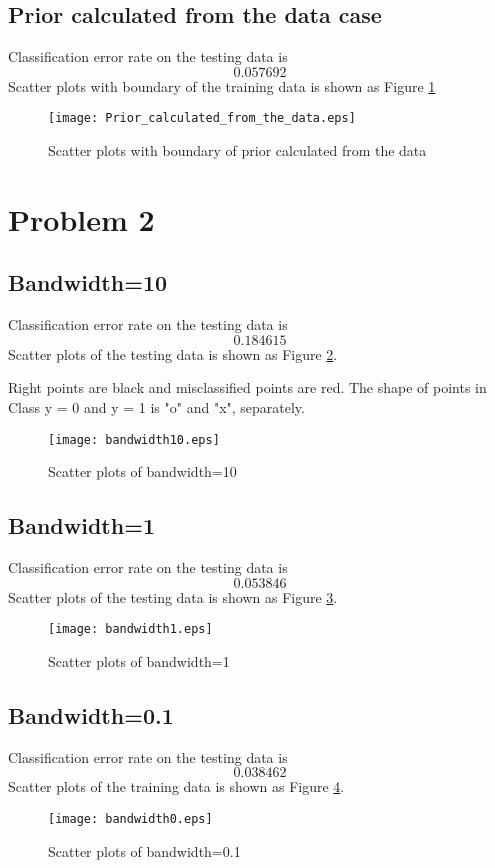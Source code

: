 \documentclass{article}
\begin{document}
\subsection{Prior calculated from the data case}
Classification error rate on the testing data is
			 \begin{equation}
				0.057692
				\end{equation}
Scatter plots with boundary  of the training data is shown as Figure \ref{fig:data_prior}
\begin{figure}[!hbp]
    		\texttt{[image: Prior\_calculated\_from\_the\_data.eps]}
		\centering
		\caption{Scatter plots with boundary  of prior calculated from the data}
		\label{fig:data_prior}
    		\end{figure}
\newpage
\section{Problem 2}
	\subsection{Bandwidth=10}
Classification error rate on the testing data is
			 \begin{equation}
				0.184615 
				\end{equation}
Scatter plots of the testing data is shown as Figure \ref{fig:d=10}.

Right points are black and misclassified points are red. The shape of points in Class y = 0 and y = 1 is "o" and "x", separately.
\begin{figure}[!hbp]
    		\texttt{[image: bandwidth10.eps]}
		\centering
		\caption{Scatter plots of bandwidth=10}
		\label{fig:d=10}
    		\end{figure}
	\subsection{Bandwidth=1}
Classification error rate on the testing data is
			 \begin{equation}
				0.053846
				\end{equation}
Scatter plots of the testing data is shown as Figure \ref{fig:d=1}. 
\begin{figure}[!hbp]
    		\texttt{[image: bandwidth1.eps]}
		\centering
		\caption{Scatter plots of bandwidth=1}
		\label{fig:d=1}
    		\end{figure}
\subsection{Bandwidth=0.1}
Classification error rate on the testing data is
			 \begin{equation}
				0.038462
				\end{equation}
Scatter plots of the training data is shown as Figure \ref{fig:d=0.1}.
\begin{figure}[!hbp]
    		\texttt{[image: bandwidth0.eps]}
		\centering
		\caption{Scatter plots of bandwidth=0.1}
		\label{fig:d=0.1}
    		\end{figure}
\end{document}
